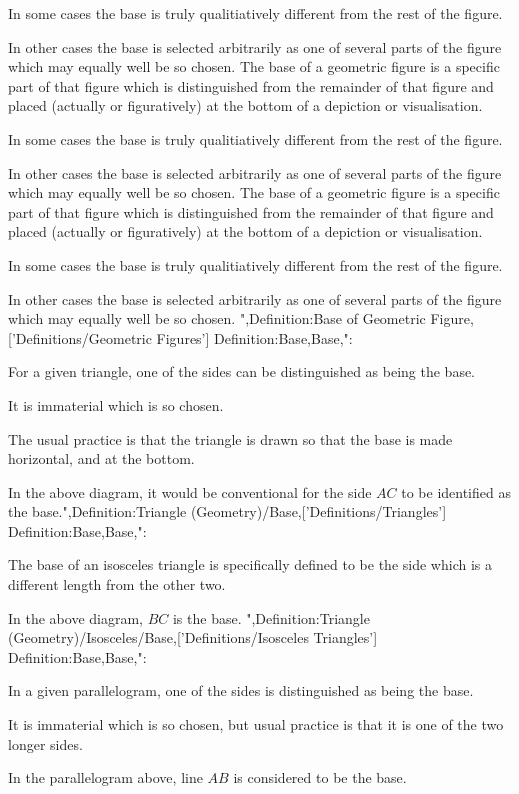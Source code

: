 In some cases the base is truly qualitiatively different from the rest of the figure.

In other cases the base is selected arbitrarily as one of several parts of the figure which may equally well be so chosen.
The base of a geometric figure is a specific part of that figure which is distinguished from the remainder of that figure and placed (actually or figuratively) at the bottom of a depiction or visualisation.

In some cases the base is truly qualitiatively different from the rest of the figure.

In other cases the base is selected arbitrarily as one of several parts of the figure which may equally well be so chosen.
The base of a geometric figure is a specific part of that figure which is distinguished from the remainder of that figure and placed (actually or figuratively) at the bottom of a depiction or visualisation.

In some cases the base is truly qualitiatively different from the rest of the figure.

In other cases the base is selected arbitrarily as one of several parts of the figure which may equally well be so chosen.
",Definition:Base of Geometric Figure,['Definitions/Geometric Figures']
Definition:Base,Base,":


For a given triangle, one of the sides can be distinguished as being the base.

It is immaterial which is so chosen.

The usual practice is that the triangle is drawn so that the base is made horizontal, and at the bottom.

In the above diagram, it would be conventional for the side $AC$ to be identified as the base.",Definition:Triangle (Geometry)/Base,['Definitions/Triangles']
Definition:Base,Base,":


The base of an isosceles triangle is specifically defined to be the side which is a different length from the other two.

In the above diagram, $BC$ is the base.
",Definition:Triangle (Geometry)/Isosceles/Base,['Definitions/Isosceles Triangles']
Definition:Base,Base,":

In a given parallelogram, one of the sides is distinguished as being the base.

It is immaterial which is so chosen, but usual practice is that it is one of the two longer sides.

In the parallelogram above, line $AB$ is considered to be the base.


